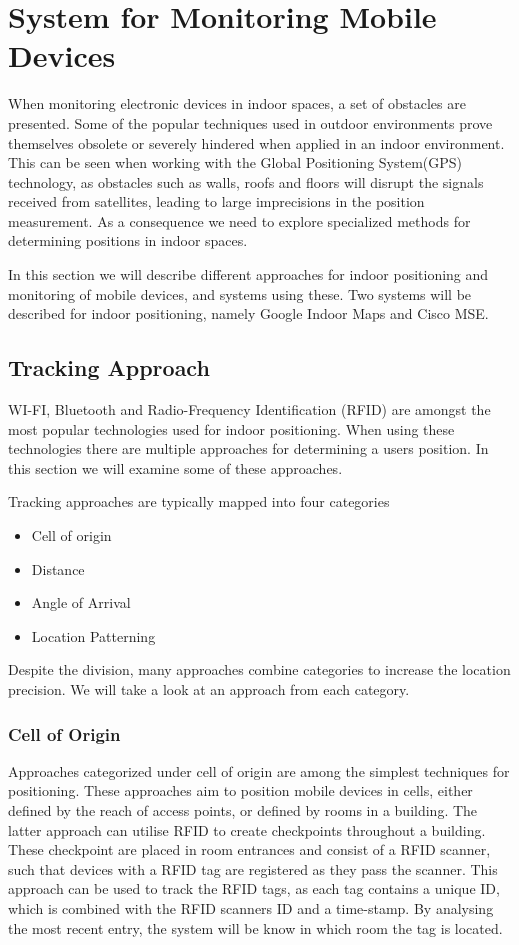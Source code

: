 \section{System for Monitoring Mobile Devices}\label{sec:monitoring}
When monitoring electronic devices in indoor spaces, a set of obstacles are presented. Some of the popular techniques used in outdoor environments prove themselves obsolete or severely hindered when applied in an indoor environment.  This can be seen when working with the Global Positioning System(GPS) technology, as obstacles such as walls, roofs and floors will disrupt the signals received from satellites, leading to large imprecisions in the position measurement. As a consequence we need to explore specialized methods for determining positions in indoor spaces.

In this section we will describe different approaches for indoor positioning and monitoring of mobile devices, and systems using these. Two systems will be described for indoor positioning, namely Google Indoor Maps and Cisco MSE.

\subsection{Tracking Approach}\label{sec:tracking_approach}
WI-FI, Bluetooth and Radio-Frequency Identification (RFID) are amongst the most popular technologies used for indoor positioning. When using these technologies there are multiple approaches for determining a users position. In this section we will examine some of these approaches.

Tracking approaches are typically mapped into four categories\cite{tracking_approaches}
\begin{itemize}
\item Cell of origin
\item Distance
\item Angle of Arrival
\item Location Patterning
\end{itemize}
Despite the division, many approaches combine categories to increase the location precision. We will take a look at an approach from each category.

\subsubsection*{Cell of Origin}
Approaches categorized under cell of origin are among the simplest techniques for positioning. These approaches aim to position mobile devices in cells, either defined by the reach of access points, or defined by rooms in a building.
The latter approach can utilise RFID to create checkpoints throughout a building. These checkpoint are placed in room entrances and consist of a RFID scanner, such that devices with a RFID tag are registered as they pass the scanner\cite{indoor_bin}. 
This approach can be used to track the RFID tags, as each tag contains a unique ID, which is combined with the RFID scanners ID and a time-stamp. By analysing the most recent entry, the system will be know in which room the tag is located\cite{RFIDjournal}.

